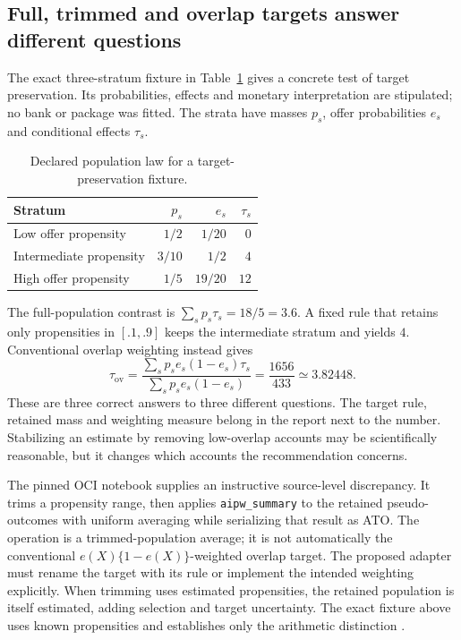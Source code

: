 \subsection{Full, trimmed and overlap targets answer different questions}

The exact three-stratum fixture in Table~\ref{exec14:target-table} gives a
concrete test of target preservation. Its probabilities, effects and monetary
interpretation are stipulated; no bank or package was fitted. The strata have
masses $p_s$, offer probabilities $e_s$ and conditional effects $\tau_s$.
\begin{table}[htbp]
\centering
\caption{Declared population law for a target-preservation fixture.}
\label{exec14:target-table}
\begin{tabular}{lrrr}
\toprule
Stratum & $p_s$ & $e_s$ & $\tau_s$\\
\midrule
Low offer propensity & $1/2$ & $1/20$ & $0$\\
Intermediate propensity & $3/10$ & $1/2$ & $4$\\
High offer propensity & $1/5$ & $19/20$ & $12$\\
\bottomrule
\end{tabular}
\end{table}
The full-population contrast is $\sum_s p_s\tau_s=18/5=3.6$. A fixed rule that
retains only propensities in $[.1,.9]$ keeps the intermediate stratum and yields
$4$. Conventional overlap weighting instead gives
\[
 \tau_{\mathrm{ov}}=
 \frac{\sum_s p_s e_s(1-e_s)\tau_s}{\sum_s p_s e_s(1-e_s)}
 =\frac{1656}{433}\simeq3.82448.
\]
These are three correct answers to three different questions. The target rule,
retained mass and weighting measure belong in the report next to the number.
Stabilizing an estimate by removing low-overlap accounts may be scientifically
reasonable, but it changes which accounts the recommendation concerns.

The pinned OCI notebook supplies an instructive source-level discrepancy. It
trims a propensity range, then applies \texttt{aipw\_summary} to the retained
pseudo-outcomes with uniform averaging while serializing that result as ATO.
The operation is a trimmed-population average; it is not automatically the
conventional $e(X)\{1-e(X)\}$-weighted overlap target. The proposed adapter must
rename the target with its rule or implement the intended weighting explicitly.
When trimming uses estimated propensities, the retained population is itself
estimated, adding selection and target uncertainty. The exact fixture above
uses known propensities and establishes only the arithmetic distinction
\citep{exec14_estimation_sources,exec14_estimation_oracles}.

